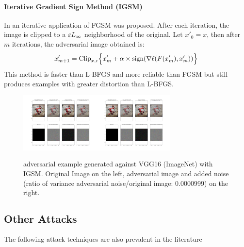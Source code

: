\paragraph{Iterative Gradient Sign Method (IGSM)}
\label{igsm-s}
In \cite{kurakin_adversarial_2016}
  an iterative application of FGSM was proposed. After each
  iteration, the image is clipped to a $\varepsilon L_\infty$ neighborhood of the original. Let $x'_0 = x$, then after $m$ iterations, the adversarial image obtained is:
\begin{equation}
x_{m+1}' = \text{Clip}_{x,\epsilon} \Bigl\{x_m' + \alpha \times \text{sign}(\nabla \ell (F(x'_m),x'_m))  \Bigr\} 
\label{igsm}
\end{equation}
This method is faster than L-BFGS and more reliable than FGSM but still produces examples with greater distortion than L-BFGS. 
\begin{figure}[H]
  \centering
\includegraphics[trim=200 110 1200 102, clip,width=4cm]{c1_figures/ILSVRC2012_val_00002900summary_plot.png}\includegraphics[trim=900 110 500 102, clip,width=4cm]{c1_figures/ILSVRC2012_val_00002900summary_plot.png}
\label{fgsmhip}
\caption{adversarial example generated against VGG16 (ImageNet) with IGSM. Original Image on the left, adversarial image and added noise (ratio of variance adversarial noise/original image: 0.0000999) on the right. }
\end{figure}



\subsection{Other Attacks}
The following attack techniques are also prevalent in the literature 


